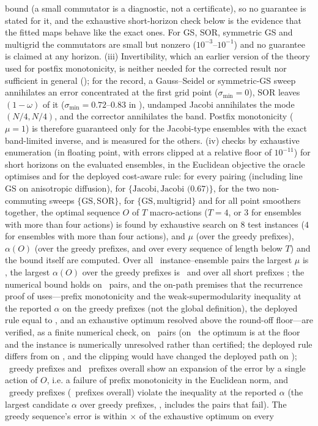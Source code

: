 bound (a small commutator is a diagnostic, not a certificate), so no guarantee is stated for it, and the exhaustive short-horizon check below is the evidence that the fitted maps behave like the exact ones. For GS, SOR, symmetric GS and multigrid the commutators are small but nonzero ($10^{-3}$--$10^{-1}$) and no guarantee is claimed at any horizon. (iii) Invertibility, which an earlier version of the theory used for postfix monotonicity, is neither needed for the corrected result nor sufficient in general (); for the record, a Gauss--Seidel or symmetric-GS sweep annihilates an error concentrated at the first grid point ($\sigma_{\min} = 0$), SOR leaves $(1-\omega)$ of it ($\sigma_{\min} = 0.72$--$0.83$ in ), undamped Jacobi annihilates the mode $(N/4, N/4)$, and the corrector annihilates the band. Postfix monotonicity ($\mu = 1$) is therefore guaranteed only for the Jacobi-type ensembles with the exact band-limited inverse, and is measured for the others. (iv)  checks  by exhaustive enumeration (in floating point, with errors clipped at a relative floor of $10^{-11}$) for short horizons on the evaluated ensembles, in the Euclidean objective the oracle optimises and for the deployed cost-aware rule: for every pairing (including line GS on anisotropic diffusion), for $\{\text{Jacobi}, \text{Jacobi (0.67)}\}$, for the two non-commuting sweeps $\{\text{GS}, \text{SOR}\}$, for $\{\text{GS}, \text{multigrid}\}$ and for all point smoothers together, the optimal sequence $O$ of $T$ macro-actions ($T = 4$, or $3$ for ensembles with more than four actions) is found by exhaustive search on $8$ test instances ($4$ for ensembles with more than four actions), and $\mu$ (over the greedy prefixes), $\alpha(O)$ (over the greedy prefixes, and over every sequence of length below $T$) and the bound itself are computed. Over all \caThmN\ instance--ensemble pairs the largest $\mu$ is \caThmMuMax, the largest $\alpha(O)$ over the greedy prefixes is \caThmAlphaGreedyMax\ and over all short prefixes \caThmAlphaAllMax; the numerical bound holds on \caThmHolds\ pairs, and the on-path premises that the recurrence proof of  uses---prefix monotonicity and the weak-supermodularity inequality at the reported $\alpha$ on the greedy prefixes (not the global definition), the deployed rule equal to , and an exhaustive optimum resolved above the round-off floor---are verified, as a finite numerical check, on \caThmPremises\ pairs (on \caThmFloor\ the optimum is at the floor and the instance is numerically unresolved rather than certified; the deployed rule differs from  on \caThmPlainDiff, and the clipping would have changed the deployed path on \caThmClip); \caThmExpand\ greedy prefixes and \caThmExpandAll\ prefixes overall show an expansion of the error by a single action of $O$, i.e. a failure of prefix monotonicity in the Euclidean norm, and \caThmViol\ greedy prefixes (\caThmViolAll\ prefixes overall) violate the inequality at the reported $\alpha$ (the largest candidate $\alpha$ over greedy prefixes, \caThmAlphaGreedyMax, includes the pairs that fail). The greedy sequence's error is within \caThmMaxRatio$\times$ of the exhaustive optimum on every 